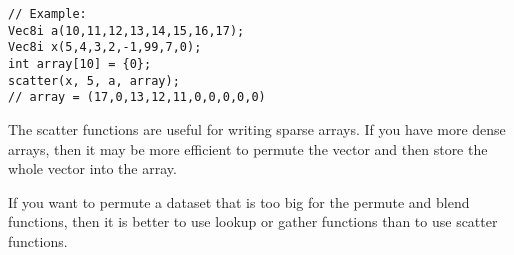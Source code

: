 \documentclass[vcl_manual.tex]{subfiles}
\begin{document}
\begin{lstlisting}[frame=none]
// Example:
Vec8i a(10,11,12,13,14,15,16,17);
Vec8i x(5,4,3,2,-1,99,7,0);
int array[10] = {0};
scatter(x, 5, a, array);
// array = (17,0,13,12,11,0,0,0,0,0)
\end{lstlisting}

The scatter functions are useful for writing sparse arrays. If you have more dense arrays, then it may be more efficient to permute the vector and then store the whole vector into the array.

If you want to permute a dataset that is too big for the permute and blend functions, then it is better to use lookup or gather functions than to use scatter functions.
\end{document}
